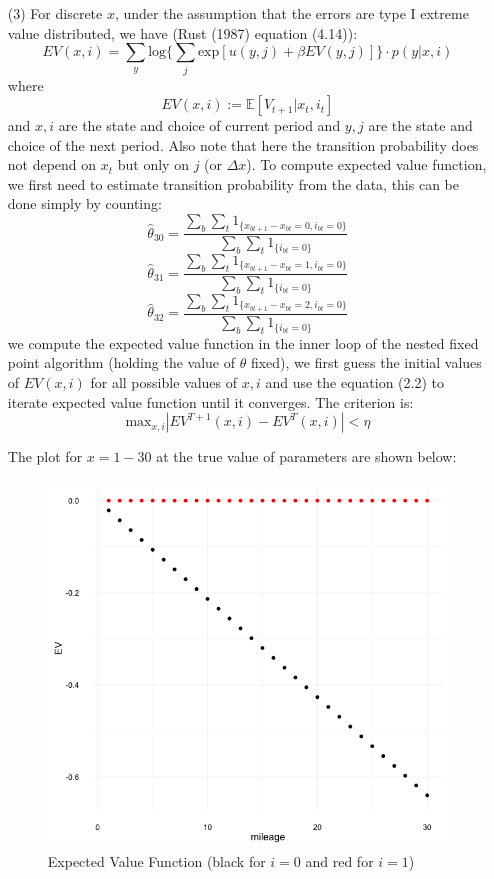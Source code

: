 \documentclass[paper=a4, fontsize=11pt]{scrartcl} %
\numberwithin{equation}{section} %
\numberwithin{figure}{section} %
\numberwithin{table}{section} %
\begin{document}
\begin{itemize}
\begin{itemize}
\item[(3)]
For discrete $x$, under the assumption that the errors are type I extreme value distributed, we have (Rust (1987) equation (4.14)):
\[EV(x,i) = \sum_y \text{log} \{\sum_{j} \text{exp}[u(y,j)+\beta EV(y,j)]\}\cdot p(y|x,i)\tag{2.2}\]
where 
\[EV(x,i) := \mathbb{E}[V_{t+1}|x_t,i_t]\] 
and $x, i$ are the state and choice of current period and $y,j$ are the state and choice of the next period. Also note that here the transition probability does not depend on $x_t$ but only on $j$ (or $\Delta x$). To compute expected value function, we first need to estimate transition probability from the data, this can be done simply by counting:
\[\hat{\theta}_{30} = \frac{\sum_{b}\sum_{t} 1_{\{x_{bt+1}-x_{bt}=0, i_{bt}=0\}}}{\sum_{b}\sum_{t} 1_{\{i_{bt}=0\}}}\]
\[\hat{\theta}_{31} = \frac{\sum_{b}\sum_{t} 1_{\{x_{bt+1}-x_{bt}=1, i_{bt}=0\}}}{\sum_{b}\sum_{t} 1_{\{i_{bt}=0\}}}\]
\[\hat{\theta}_{32} = \frac{\sum_{b}\sum_{t} 1_{\{x_{bt+1}-x_{bt}=2, i_{bt}=0\}}}{\sum_{b}\sum_{t} 1_{\{i_{bt}=0\}}}\]
we compute the expected value function in the inner loop of the nested fixed point algorithm (holding the value of $\theta$ fixed), we first guess the initial values of $EV(x,i)$ for all possible values of $x,i$ and use the equation (2.2) to iterate expected value function until it converges. The criterion is:
\[\text{max}_{x,i}|EV^{T+1}(x,i)-EV^T(x,i)|<\eta\]

The plot for $x=1-30$ at the true value of parameters are shown below:

\begin{figure}[ht!]
\centering
\includegraphics[scale=.6]{EV.png}
\caption{Expected Value Function (black for $i=0$ and red for $i=1$)} 
\end{figure} 


\end{itemize}
\end{itemize}
\end{document}
